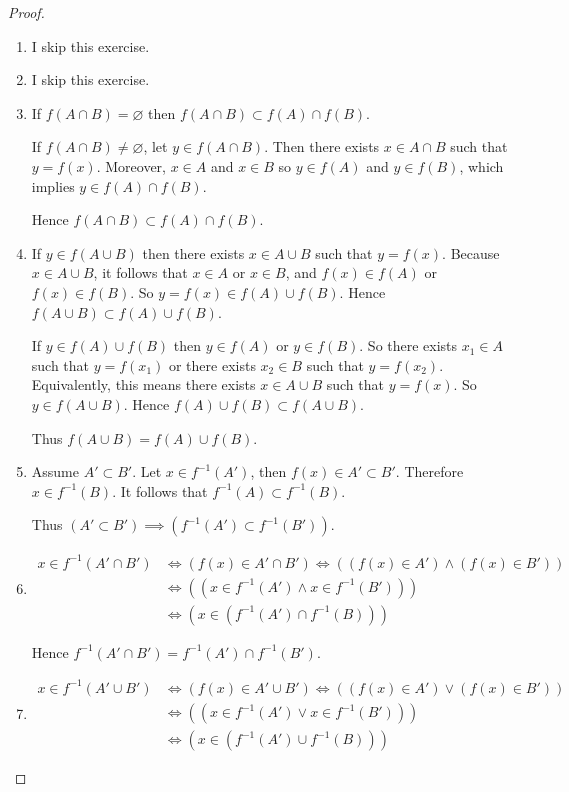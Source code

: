 \begin{proof}
    \begin{enumerate}[label={(\alph*)}]
        \item I skip this exercise.
        \item I skip this exercise.
        \item If $f(A\cap B) = \varnothing$ then $f(A\cap B)\subset f(A)\cap f(B)$.

              If $f(A\cap B)\ne\varnothing$, let $y\in f(A\cap B)$. Then there exists $x\in A\cap B$ such that $y = f(x)$. Moreover, $x\in A$ and $x\in B$ so $y\in f(A)$ and $y\in f(B)$, which implies $y\in f(A)\cap f(B)$.

              Hence $f(A\cap B)\subset f(A)\cap f(B)$.
        \item If $y\in f(A\cup B)$ then there exists $x\in A\cup B$ such that $y = f(x)$. Because $x\in A\cup B$, it follows that $x\in A$ or $x\in B$, and $f(x)\in f(A)$ or $f(x)\in f(B)$. So $y = f(x)\in f(A)\cup f(B)$. Hence $f(A\cup B)\subset f(A)\cup f(B)$.

              If $y\in f(A)\cup f(B)$ then $y\in f(A)$ or $y\in f(B)$. So there exists $x_{1}\in A$ such that $y = f(x_{1})$ or there exists $x_{2}\in B$ such that $y = f(x_{2})$. Equivalently, this means there exists $x\in A\cup B$ such that $y = f(x)$. So $y\in f(A\cup B)$. Hence $f(A)\cup f(B)\subset f(A\cup B)$.

              Thus $f(A\cup B) = f(A)\cup f(B)$.
        \item Assume $A'\subset B'$. Let $x\in f^{-1}(A')$, then $f(x)\in A'\subset B'$. Therefore $x\in f^{-1}(B)$. It follows that $f^{-1}(A)\subset f^{-1}(B)$.

              Thus $(A'\subset B')\implies (f^{-1}(A')\subset f^{-1}(B'))$.
        \item \begin{align*}
                  x\in f^{-1}(A'\cap B') & \Leftrightarrow (f(x)\in A'\cap B') \Leftrightarrow ((f(x)\in A') \land (f(x)\in B')) \\
                                         & \Leftrightarrow ((x\in f^{-1}(A') \land x\in f^{-1}(B')))                             \\
                                         & \Leftrightarrow (x\in (f^{-1}(A')\cap f^{-1}(B)))
              \end{align*}

              Hence $f^{-1}(A'\cap B') = f^{-1}(A')\cap f^{-1}(B')$.
        \item \begin{align*}
                  x\in f^{-1}(A'\cup B') & \Leftrightarrow (f(x)\in A'\cup B') \Leftrightarrow ((f(x)\in A') \lor (f(x)\in B')) \\
                                         & \Leftrightarrow ((x\in f^{-1}(A') \lor x\in f^{-1}(B')))                             \\
                                         & \Leftrightarrow (x\in (f^{-1}(A')\cup f^{-1}(B)))
              \end{align*}


\end{enumerate}
\end{proof}
